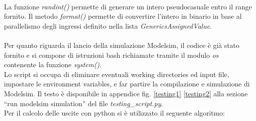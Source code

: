 \\
La funzione \textit{randint()} permette di generare un intero pseudocasuale entro il range fornito.
Il metodo \textit{format()} permette di convertire l’intero in binario in base al parallelismo degli ingressi definito nella lista \textit{GenericsAssignedValue}.\\
\\
Per quanto riguarda il lancio della simulazione Modelsim, il codice è già stato fornito e si compone di istruzioni bash richiamate tramite il modulo \textit{os} contenente la funzione \textit{system()}.
\\
Lo script si occupa di eliminare eventuali working directories ed input file, impostare le environment variables, e far partire la compilazione e simulazione di Modelsim.
Il testo è disponibile in appendice fig. \ref{testing1} \ref{testing2} alla sezione “run modelsim simulation” del file \textit{testing\_script.py}.
\\
Per il calcolo delle uscite con python si è utilizzato il seguente algoritmo:\\
